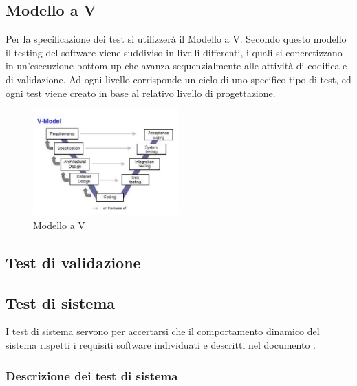 	\subsection{Modello a V}
	\label{modelloAV}
			Per la specificazione dei test si utilizzerà il Modello a V. Secondo questo modello il testing del software viene suddiviso in livelli differenti, i quali si concretizzano in un'esecuzione bottom-up che avanza sequenzialmente alle attività di codifica e di validazione. Ad ogni livello corrisponde un ciclo di uno specifico tipo di test, ed ogni test viene creato in base al relativo livello di progettazione.
			\begin{figure}[htp]
				\centering
				\includegraphics[width=0.5\textwidth]{img/V-model.jpg}
				\caption{Modello a V}
			\end{figure}
	\subsection{Test di validazione}
	\label{testDiValidazione}
	
		
	\subsection{Test di sistema}
	\label{testDiSistema}
		I test di sistema servono per accertarsi che il comportamento dinamico del sistema rispetti i requisiti software individuati e descritti nel documento \ARdoc.
		\subsubsection{Descrizione dei test di sistema}
			
			
			

